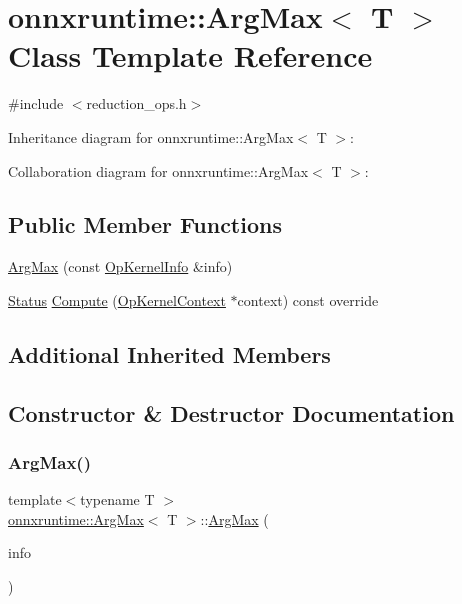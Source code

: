\hypertarget{classonnxruntime_1_1ArgMax}{}\section{onnxruntime\+:\+:Arg\+Max$<$ T $>$ Class Template Reference}
\label{classonnxruntime_1_1ArgMax}


{\ttfamily \#include $<$reduction\+\_\+ops.\+h$>$}



Inheritance diagram for onnxruntime\+:\+:Arg\+Max$<$ T $>$\+:


Collaboration diagram for onnxruntime\+:\+:Arg\+Max$<$ T $>$\+:
\subsection*{Public Member Functions}
\begin{DoxyCompactItemize}
\item 
\mbox{\hyperlink{classonnxruntime_1_1ArgMax_a5ba3d4c55a0f3f798a15e36c87926b1e}{Arg\+Max}} (const \mbox{\hyperlink{classonnxruntime_1_1OpKernelInfo}{Op\+Kernel\+Info}} \&info)
\item 
\mbox{\hyperlink{classonnxruntime_1_1common_1_1Status}{Status}} \mbox{\hyperlink{classonnxruntime_1_1ArgMax_a95bd6bd0ac4edacd65b56d623048e3b8}{Compute}} (\mbox{\hyperlink{classonnxruntime_1_1OpKernelContext}{Op\+Kernel\+Context}} $\ast$context) const override
\end{DoxyCompactItemize}
\subsection*{Additional Inherited Members}


\subsection{Constructor \& Destructor Documentation}
\mbox{\label{classonnxruntime_1_1ArgMax_a5ba3d4c55a0f3f798a15e36c87926b1e}} 
\subsubsection{\texorpdfstring{Arg\+Max()}{ArgMax()}}
{\footnotesize\ttfamily template$<$typename T $>$ \\
\mbox{\hyperlink{classonnxruntime_1_1ArgMax}{onnxruntime\+::\+Arg\+Max}}$<$ T $>$\+::\mbox{\hyperlink{classonnxruntime_1_1ArgMax}{Arg\+Max}} (\begin{DoxyParamCaption}\item[{const \mbox{\hyperlink{classonnxruntime_1_1OpKernelInfo}{Op\+Kernel\+Info}} \&}]{info }\end{DoxyParamCaption})\hspace{0.3cm}{\ttfamily [inline]}}




